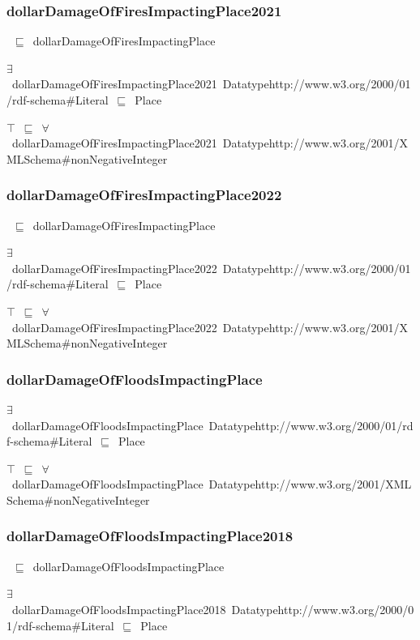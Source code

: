 \documentclass{article}
\begin{document}
\subsubsection*{dollarDamageOfFiresImpactingPlace2021}

~\ensuremath{\sqsubseteq}~dollarDamageOfFiresImpactingPlace

\ensuremath{\exists}~dollarDamageOfFiresImpactingPlace2021~Datatypehttp://www.w3.org/2000/01/rdf-schema#Literal~\ensuremath{\sqsubseteq}~Place

\ensuremath{\top}~\ensuremath{\sqsubseteq}~\ensuremath{\forall}~dollarDamageOfFiresImpactingPlace2021~Datatypehttp://www.w3.org/2001/XMLSchema#nonNegativeInteger

\subsubsection*{dollarDamageOfFiresImpactingPlace2022}

~\ensuremath{\sqsubseteq}~dollarDamageOfFiresImpactingPlace

\ensuremath{\exists}~dollarDamageOfFiresImpactingPlace2022~Datatypehttp://www.w3.org/2000/01/rdf-schema#Literal~\ensuremath{\sqsubseteq}~Place

\ensuremath{\top}~\ensuremath{\sqsubseteq}~\ensuremath{\forall}~dollarDamageOfFiresImpactingPlace2022~Datatypehttp://www.w3.org/2001/XMLSchema#nonNegativeInteger

\subsubsection*{dollarDamageOfFloodsImpactingPlace}

\ensuremath{\exists}~dollarDamageOfFloodsImpactingPlace~Datatypehttp://www.w3.org/2000/01/rdf-schema#Literal~\ensuremath{\sqsubseteq}~Place

\ensuremath{\top}~\ensuremath{\sqsubseteq}~\ensuremath{\forall}~dollarDamageOfFloodsImpactingPlace~Datatypehttp://www.w3.org/2001/XMLSchema#nonNegativeInteger

\subsubsection*{dollarDamageOfFloodsImpactingPlace2018}

~\ensuremath{\sqsubseteq}~dollarDamageOfFloodsImpactingPlace

\ensuremath{\exists}~dollarDamageOfFloodsImpactingPlace2018~Datatypehttp://www.w3.org/2000/01/rdf-schema#Literal~\ensuremath{\sqsubseteq}~Place
\end{document}
